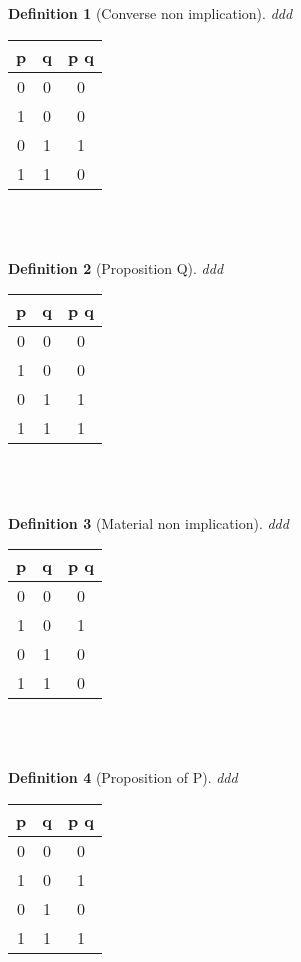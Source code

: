 \documentclass[10pt,a4paper,draft,titlepage,onecolumn]{book}
\newtheorem{definition}{Definition}[section]
\begin{document}
\begin{definition}[Converse non implication]ddd
\end{definition}  
\begin{tabular}{ |c|c|c| }
 \hline
 p & q &  p  q  \\
 \hline
 0 & 0 & 0 \\
 1 & 0 & 0\\
 0 & 1 & 1\\
 1 & 1 & 0\\
 \hline
\end{tabular}\\\\

\begin{definition}[Proposition Q]ddd
\end{definition}
\begin{tabular}{ |c|c|c| }
 \hline
 p & q &  p  q  \\
 \hline
 0 & 0 & 0 \\
 1 & 0 & 0\\
 0 & 1 & 1\\
 1 & 1 & 1\\
 \hline
\end{tabular}\\\\



\begin{definition}[Material non implication]ddd
\end{definition}
\begin{tabular}{ |c|c|c| }
 \hline
 p & q &  p  q  \\
 \hline
 0 & 0 & 0 \\
 1 & 0 & 1\\
 0 & 1 & 0\\
 1 & 1 & 0\\
 \hline
\end{tabular}\\\\


\begin{definition}[Proposition of P]ddd
\end{definition}
\begin{tabular}{ |c|c|c| }
 \hline
 p & q &  p  q  \\
 \hline
 0 & 0 & 0 \\
 1 & 0 & 1\\
 0 & 1 & 0\\
 1 & 1 & 1\\
 \hline
\end{tabular}\\\\
\end{document}
